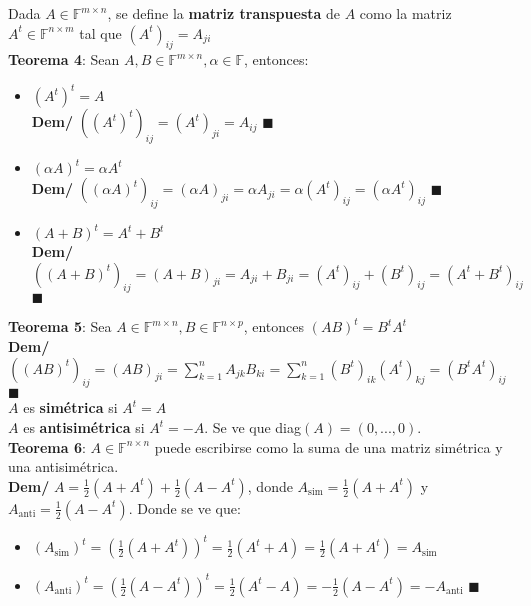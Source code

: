 \documentclass[11pt,a4paper]{article}
\newcommand*{\QEDA}{\null\nobreak\hfill\ensuremath{\blacksquare}}
\begin{document}
\newpage

Dada $A \in \mathbb{F}^{m \times n}$, se define la \textbf{matriz transpuesta} de $A$ como la matriz $A^t \in \mathbb{F}^{n \times m}$ tal que $(A^t)_{ij} = A_{ji}$\\

\textbf{Teorema 4}: Sean $A,B \in \mathbb{F}^{m \times n}, \alpha \in \mathbb{F}$, entonces:
\begin{itemize}
\itemsep-0.3em
\item $(A^t)^t = A$\\
\textbf{Dem/} $((A^t)^t)_{ij} = (A^t)_{ji} = A_{ij}$ \QEDA
\item $(\alpha A)^t = \alpha A^t$\\
\textbf{Dem/} $((\alpha A)^t)_{ij} =(\alpha A)_{ji} = \alpha A_{ji} = \alpha (A^t)_{ij} = (\alpha A^t)_{ij}$ \QEDA
\item $(A+B)^t = A^t + B^t$\\
\textbf{Dem/} $((A+B)^t)_{ij} = (A+B)_{ji} = A_{ji} + B_{ji} = (A^t)_{ij} + (B^t)_{ij} = (A^t + B^t)_{ij}$ \QEDA
\end{itemize}

\textbf{Teorema 5}: Sea $A \in \mathbb{F}^{m \times n}, B \in \mathbb{F}^{n \times p}$, entonces $(AB)^t = B^tA^t$\\
\textbf{Dem/} $((AB)^t)_{ij} = (AB)_{ji} = \sum_{k=1}^n A_{jk}B_{ki} = \sum_{k=1}^n (B^t)_{ik} (A^t)_{kj} = (B^tA^t)_{ij}$ \QEDA\\

$A$ es \textbf{sim\'etrica} si $A^t = A$\\
$A$ es \textbf{antisim\'etrica} si $A^t = -A$. Se ve que diag$(A) = (0, ..., 0)$.\\

\textbf{Teorema 6}: $A \in \mathbb{F}^{n \times n}$ puede escribirse como la suma de una matriz sim\'etrica y una antisim\'etrica.\\
\textbf{Dem/} $A = \frac{1}{2}(A + A^t) + \frac{1}{2} (A - A^t)$, donde $A_\text{sim} = \frac{1}{2}(A + A^t)$ y $A_\text{anti} = \frac{1}{2}(A - A^t)$. Donde se ve que:
\begin{itemize}
\itemsep-0.3em
\item $(A_\text{sim})^t = (\frac{1}{2}(A + A^t))^t = \frac{1}{2}(A^t + A) = \frac{1}{2}(A + A^t) = A_\text{sim}$
\item $(A_\text{anti})^t = (\frac{1}{2}(A - A^t))^t = \frac{1}{2}(A^t - A) = -\frac{1}{2}(A - A^t) = -A_\text{anti}$ \QEDA\\
\end{itemize}
\end{document}
